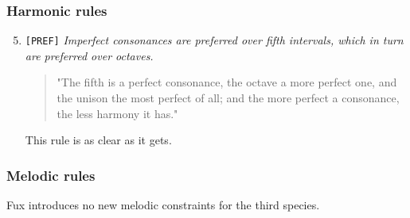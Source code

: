 \subsubsection{Harmonic rules}
\begin{enumerate}[wide, label=\bfseries 4.H\arabic*]
    \setcounter{enumi}{4}
    \item \texttt{[PREF]} \textit{Imperfect consonances are preferred over fifth intervals, which in turn are preferred over octaves.} \label{rule:prefer-fifths-over-octaves}    
    \begin{quotation}
        "The fifth is a perfect consonance, the octave a more perfect one, and the unison the most perfect of all; and the more perfect a consonance, the less harmony it has."
        \textcite[p.97]{GaPEng}
    \end{quotation}
    This rule is as clear as it gets.
\end{enumerate}

\subsubsection{Melodic rules}
Fux introduces no new melodic constraints for the third species.

